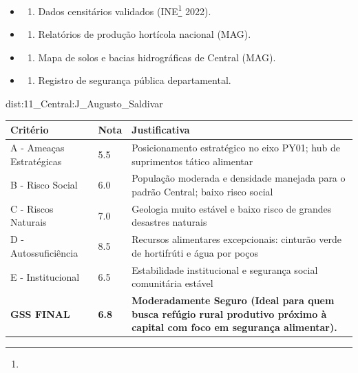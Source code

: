 {\begin{itemize}
\tightlist
\item
  \begin{enumerate}
  \def\labelenumi{\arabic{enumi})}
  \tightlist
  \item
    Dados censitários validados (INE\footnote{\fineINE} 2022).
  \end{enumerate}
\item
  \begin{enumerate}
  \def\labelenumi{\arabic{enumi})}
  \setcounter{enumi}{1}
  \tightlist
  \item
    Relatórios de produção hortícola nacional (MAG).
  \end{enumerate}
\item
  \begin{enumerate}
  \def\labelenumi{\arabic{enumi})}
  \setcounter{enumi}{2}
  \tightlist
  \item
    Mapa de solos e bacias hidrográficas de Central (MAG).
  \end{enumerate}
\item
  \begin{enumerate}
  \def\labelenumi{\arabic{enumi})}
  \setcounter{enumi}{3}
  \tightlist
  \item
    Registro de segurança pública departamental.
  \end{enumerate}
\end{itemize}}{dist:11_Central:J_Augusto_Saldivar}
\begin{table}[ht!]
\small \begin{tabular}{p{3.0cm}p{0.8cm}p{6.0cm}} \toprule
\textbf{Critério} & \textbf{Nota} & \textbf{Justificativa} \\ \midrule
A - Ameaças Estratégicas & 5.5 & Posicionamento estratégico no eixo PY01; hub de suprimentos tático alimentar \\
B - Risco Social & 6.0 & População moderada e densidade manejada para o padrão Central; baixo risco social \\
C - Riscos Naturais & 7.0 & Geologia muito estável e baixo risco de grandes desastres naturais \\
D - Autossuficiência & 8.5 & Recursos alimentares excepcionais: cinturão verde de hortifrúti e água por poços \\
E - Institucional & 6.5 & Estabilidade institucional e segurança social comunitária estável \\
\midrule \textbf{GSS FINAL} & \textbf{6.8} & \textbf{Moderadamente Seguro (Ideal para quem busca refúgio rural produtivo próximo à capital com foco em segurança alimentar).} \\ \bottomrule \end{tabular}
\end{table}
